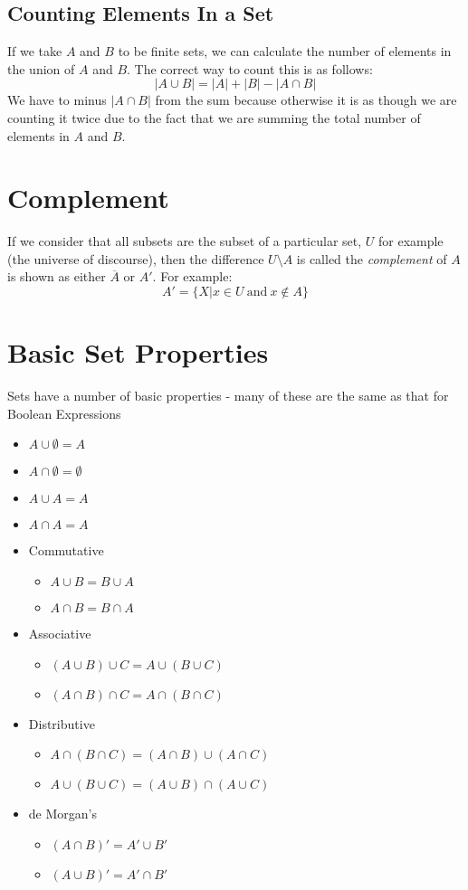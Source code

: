 \subsection{Counting Elements In a Set}
If we take $A$ and $B$ to be finite sets, we can calculate the number of elements in the union of $A$ and $B$. The correct way to count this is as follows:
\[|A \cup B| = |A| + |B| - |A\cap B|\]
We have to minus $|A \cap B|$ from the sum because otherwise it is as though we are counting it twice due to the fact that we are summing the total number of elements in $A$ and $B$.

\section{Complement}
If we consider that all subsets are the subset of a particular set, $U$ for example (the universe of discourse), then the difference $U\setminus A$ is called the \textit{complement} of $A$ is shown as either $\overline{A}$ or $A'$. For example:
\[A' = \{X | x \in U \mathrm{\ and\ } x \notin A\}\]

\section{Basic Set Properties}
Sets have a number of basic properties - many of these are the same as that for Boolean Expressions
\begin{itemize}
    \item $A \cup \emptyset = A$
    \item $A \cap \emptyset = \emptyset$
    \item $A \cup A = A$
    \item $A \cap A = A$
    \item Commutative
    \begin{itemize}
        \item $A \cup B = B \cup A$
        \item $A \cap B = B \cap A$
    \end{itemize}
    \item Associative
    \begin{itemize}
        \item $(A\cup B)\cup C = A \cup (B\cup C)$
        \item $(A\cap B)\cap C = A \cap (B\cap C)$
    \end{itemize}
    \item Distributive
    \begin{itemize}
        \item $A \cap (B \cap C) = (A \cap B) \cup (A \cap C)$
        \item $A \cup (B \cup C) = (A \cup B) \cap (A \cup C)$
    \end{itemize}
    \item de Morgan's
    \begin{itemize}
        \item $(A \cap B)' = A'\cup B'$
        \item $(A \cup B)' = A'\cap B'$
    \end{itemize}
\end{itemize}

